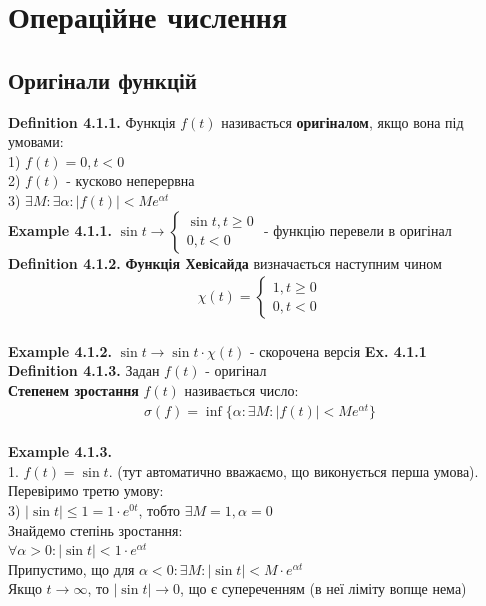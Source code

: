 \documentclass{math_library}
\begin{document}
\section{Операційне числення}
\subsection{Оригінали функцій}
\textbf{Definition 4.1.1.} Функція $f(t)$ називається \textbf{оригіналом}, якщо вона під умовами:\\
1) $f(t) = 0, t<0$\\
2) $f(t)$ - кусково неперервна\\
3) $\exists M: \exists \alpha: |f(t)|<Me^{\alpha t}$
\bigskip \\
\textbf{Example 4.1.1.} $\sin t \to \begin{cases} \sin t, t \geq 0 \\ 0, t < 0 \end{cases}$ - функцію перевели в оригінал
\bigskip \\
\textbf{Definition 4.1.2.} \textbf{Функція Хевісайда} визначається наступним чином
\begin{align*}
\chi(t) = \begin{cases} 1, t \geq 0 \\ 0, t < 0 \end{cases}
\end{align*}
\\
\textbf{Example 4.1.2.} $\sin t \to \sin t \cdot \chi(t)$ - скорочена версія \textbf{Ex. 4.1.1}
\bigskip \\
\textbf{Definition 4.1.3.} Задан $f(t)$ - оригінал\\
\textbf{Степенем зростання} $f(t)$ називається число:
\begin{align*}
\sigma(f) = \inf\{\alpha: \exists M: |f(t)| < Me^{\alpha t}\}
\end{align*}
\\
\textbf{Example 4.1.3.}\\
1. $f(t) = \sin t$. (тут автоматично вважаємо, що виконується перша умова). Перевіримо третю умову:\\
3) $|\sin t| \leq 1 = 1 \cdot e^{0t}$, тобто $\exists M=1, \alpha = 0$\\
Знайдемо степінь зростання:\\
$\forall \alpha > 0: |\sin t| < 1\cdot e^{\alpha t}$\\
Припустимо, що для $\alpha < 0: \exists M: |\sin t| < M\cdot e^{\alpha t}$\\
Якщо $t \to \infty$, то $|\sin t| \to 0$, що є супереченням (в неї ліміту вопще нема)\\
\end{document}
